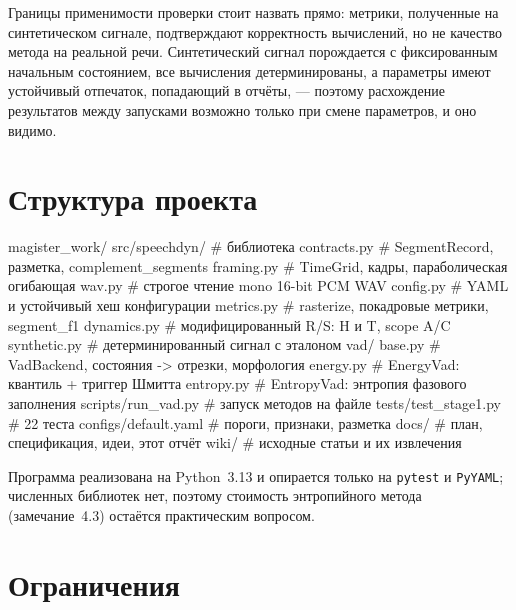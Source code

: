 \documentclass[11pt,a4paper]{article}
\theoremstyle{definition}
\theoremstyle{plain}
\newcommand{\code}[1]{\texttt{#1}}
\begin{document}
Границы применимости проверки стоит назвать прямо: метрики, полученные на
синтетическом сигнале, подтверждают корректность вычислений, но не качество
метода на реальной речи. Синтетический сигнал порождается с фиксированным
начальным состоянием, все вычисления детерминированы, а параметры имеют
устойчивый отпечаток, попадающий в отчёты, --- поэтому расхождение результатов
между запусками возможно только при смене параметров, и оно видимо.

\section{Структура проекта}

\begin{TreeCode}
magister_work/
  src/speechdyn/            # библиотека
    contracts.py            # SegmentRecord, разметка, complement_segments
    framing.py              # TimeGrid, кадры, параболическая огибающая
    wav.py                  # строгое чтение mono 16-bit PCM WAV
    config.py               # YAML и устойчивый хеш конфигурации
    metrics.py              # rasterize, покадровые метрики, segment_f1
    dynamics.py             # модифицированный R/S: H и T, scope A/C
    synthetic.py            # детерминированный сигнал с эталоном
    vad/
      base.py               # VadBackend, состояния -> отрезки, морфология
      energy.py             # EnergyVad: квантиль + триггер Шмитта
      entropy.py            # EntropyVad: энтропия фазового заполнения
  scripts/run_vad.py        # запуск методов на файле
  tests/test_stage1.py      # 22 теста
  configs/default.yaml      # пороги, признаки, разметка
  docs/                     # план, спецификация, идеи, этот отчёт
  wiki/                     # исходные статьи и их извлечения
\end{TreeCode}

Программа реализована на Python~3.13 и опирается только на \code{pytest} и
\code{PyYAML}; численных библиотек нет, поэтому стоимость энтропийного метода
(замечание~4.3) остаётся практическим вопросом.

\section{Ограничения}
\end{document}
